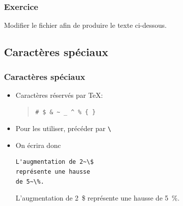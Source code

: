 \begin{frame}
  \frametitle{Exercice}

  Modifier le fichier  afin de
  produire le texte ci-dessous.

  \bigskip
  \centering
\end{frame}

\subsection{Caractères spéciaux}

\begin{frame}[fragile=singleslide]
  \frametitle{Caractères spéciaux}

  \begin{itemize}
  \item Caractères réservés par {\TeX}:
    \begin{quote}
      \verb=# $ & ~ _ ^ % { }=
    \end{quote}
  \item Pour les utiliser, précéder par \verb=\=
  \item On écrira donc
    \begin{demo}
      \begin{texample}
\begin{lstlisting}
L'augmentation de 2~\$
représente une hausse
de 5~\%.
\end{lstlisting}
        \producing
        L'augmentation de 2~\$ représente une
        hausse de 5~\%.
      \end{texample}
    \end{demo}
  \end{itemize}
\end{frame}

